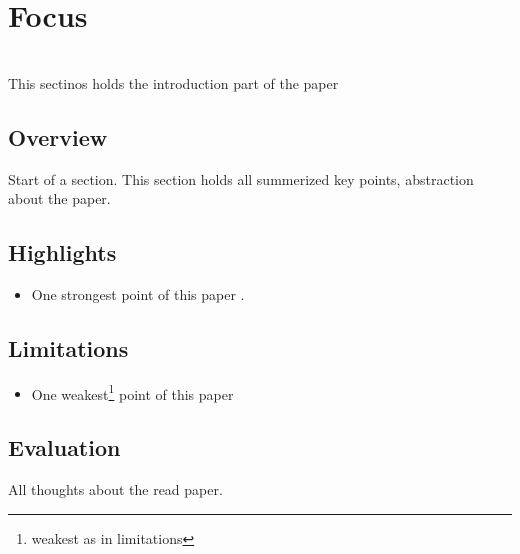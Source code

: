 \section{Focus}

 \\
This sectinos holds the introduction part of the paper
\subsection{Overview}
Start of a section. This section holds all summerized key points, abstraction about the paper.

\subsection{Highlights}
\begin{itemize}
    \item One strongest point of this paper .
\end{itemize}

\subsection{Limitations}
\begin{itemize}
    \item One weakest\footnote{weakest as in limitations} point of this paper
\end{itemize}

\subsection{Evaluation}
All thoughts about the read paper.
